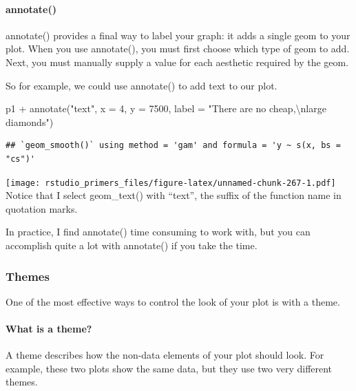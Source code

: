 \documentclass[
]{article}
\newenvironment{Shaded}{\begin{snugshade}}{\end{snugshade}}
\newcommand{\AttributeTok}[1]{\textcolor[rgb]{0.77,0.63,0.00}{#1}}
\newcommand{\DecValTok}[1]{\textcolor[rgb]{0.00,0.00,0.81}{#1}}
\newcommand{\FunctionTok}[1]{\textcolor[rgb]{0.00,0.00,0.00}{#1}}
\newcommand{\NormalTok}[1]{#1}
\newcommand{\SpecialCharTok}[1]{\textcolor[rgb]{0.00,0.00,0.00}{#1}}
\newcommand{\StringTok}[1]{\textcolor[rgb]{0.31,0.60,0.02}{#1}}
\begin{document}
\hypertarget{annotate}{%
\paragraph{annotate()}\label{annotate}}

annotate() provides a final way to label your graph: it adds a single
geom to your plot. When you use annotate(), you must first choose which
type of geom to add. Next, you must manually supply a value for each
aesthetic required by the geom.

So for example, we could use annotate() to add text to our plot.

\begin{Shaded}
\begin{Highlighting}[]
\NormalTok{p1 }\SpecialCharTok{+} \FunctionTok{annotate}\NormalTok{(}\StringTok{"text"}\NormalTok{, }\AttributeTok{x =} \DecValTok{4}\NormalTok{, }\AttributeTok{y =} \DecValTok{7500}\NormalTok{, }\AttributeTok{label =} \StringTok{"There are no cheap,}\SpecialCharTok{\textbackslash{}n}\StringTok{large diamonds"}\NormalTok{)}
\end{Highlighting}
\end{Shaded}

\begin{verbatim}
## `geom_smooth()` using method = 'gam' and formula = 'y ~ s(x, bs = "cs")'
\end{verbatim}

\texttt{[image: rstudio\_primers\_files/figure-latex/unnamed-chunk-267-1.pdf]}
Notice that I select geom\_text() with ``text'', the suffix of the
function name in quotation marks.

In practice, I find annotate() time consuming to work with, but you can
accomplish quite a lot with annotate() if you take the time.

\hypertarget{themes}{%
\subsubsection{Themes}\label{themes}}

One of the most effective ways to control the look of your plot is with
a theme.

\hypertarget{what-is-a-theme}{%
\paragraph{What is a theme?}\label{what-is-a-theme}}

A theme describes how the non-data elements of your plot should look.
For example, these two plots show the same data, but they use two very
different themes.
\end{document}
